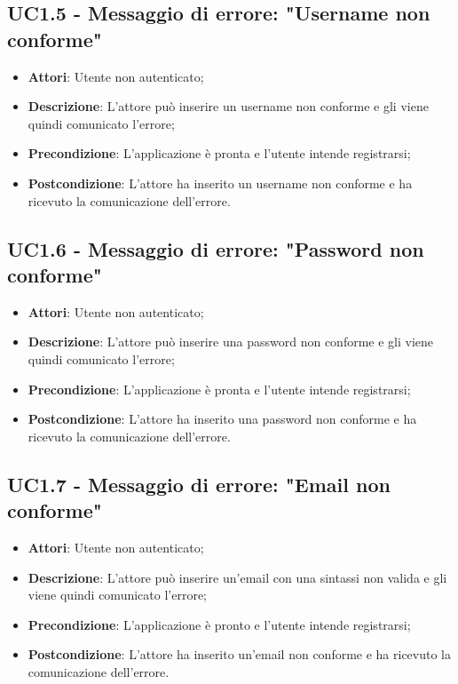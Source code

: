 \subsection{UC1.5 - Messaggio di errore: "Username non conforme"} 
\label{ssec:UC1.5} 
\begin{itemize} 
\item \textbf{Attori}: Utente non autenticato;
\item \textbf{Descrizione}: L'attore può inserire un username non conforme e gli viene quindi comunicato l'errore;
\item \textbf{Precondizione}: L'applicazione è pronta e l'utente intende registrarsi;
\item \textbf{Postcondizione}: L'attore ha inserito un username non conforme e ha ricevuto la comunicazione dell'errore.
\end{itemize} 
\subsection{UC1.6 - Messaggio di errore: "Password non conforme"} 
\label{ssec:UC1.6} 
\begin{itemize} 
\item \textbf{Attori}: Utente non autenticato;
\item \textbf{Descrizione}: L'attore può inserire una password non conforme e gli viene quindi comunicato l'errore;
\item \textbf{Precondizione}: L'applicazione è pronta e l'utente intende registrarsi;
\item \textbf{Postcondizione}: L'attore ha inserito una password non conforme e ha ricevuto la comunicazione dell'errore.
\end{itemize} 
\subsection{UC1.7 - Messaggio di errore: "Email non conforme"} 
\label{ssec:UC1.7} 
\begin{itemize} 
\item \textbf{Attori}: Utente non autenticato;
\item \textbf{Descrizione}: L'attore può inserire un'email con una sintassi non valida e gli viene quindi comunicato l'errore;
\item \textbf{Precondizione}: L'applicazione è pronto e l'utente intende registrarsi;
\item \textbf{Postcondizione}: L'attore ha inserito un'email non conforme e ha ricevuto la comunicazione dell'errore.
\end{itemize} 
\newpage
